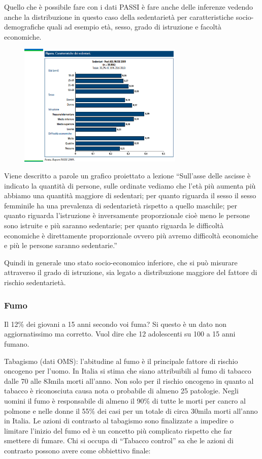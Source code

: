 Quello che è possibile fare con i dati PASSI è fare anche delle
inferenze vedendo anche la distribuzione in questo caso della
sedentarietà per caratteristiche socio-demografiche quali ad esempio
età, sesso, grado di istruzione e facoltà economiche.

\begin{figure}[!ht]
\centering
	\includegraphics[width=0.7\textwidth]{17/image3.png}
	\end{figure}

Viene descritto a parole un grafico proiettato a lezione ``Sull'asse
delle ascisse è indicato la quantità di persone, sulle ordinate vediamo
che l'età più aumenta più abbiamo una quantità maggiore di sedentari;
per quanto riguarda il sesso il sesso femminile ha una prevalenza di
sedentarietà rispetto a quello maschile; per quanto riguarda
l'istruzione è inversamente proporzionale cioè meno le persone sono
istruite e più saranno sedentarie; per quanto riguarda le difficoltà
economiche è direttamente proporzionale ovvero più avremo difficoltà
economiche e più le persone saranno sedentarie.''

Quindi in generale uno stato socio-economico inferiore, che si può
misurare attraverso il grado di istruzione, sia legato a distribuzione
maggiore del fattore di rischio sedentarietà.

\subsubsection{Fumo}

Il 12\% dei giovani a 15 anni secondo voi fuma? Si questo è un dato non
aggiornatissimo ma corretto. Vuol dire che 12 adolescenti su 100 a 15
anni fumano.

Tabagismo (dati OMS): l'abitudine al fumo è il principale fattore di
rischio oncogeno per l'uomo. In Italia si stima che siano attribuibili
al fumo di tabacco dalle 70 alle 83mila morti all'anno. Non solo per il
rischio oncogeno in quanto al tabacco è riconosciuta causa nota o
probabile di almeno 25 patologie. Negli uomini il fumo è responsabile di
almeno il 90\% di tutte le morti per cancro al polmone e nelle donne il
55\% dei casi per un totale di circa 30mila morti all'anno in Italia. Le
azioni di contrasto al tabagismo sono finalizzate a impedire o limitare
l'inizio del fumo ed è un concetto più complicato rispetto che far
smettere di fumare. Chi si occupa di ``Tabacco control'' sa che le
azioni di contrasto possono avere come obbiettivo finale:

